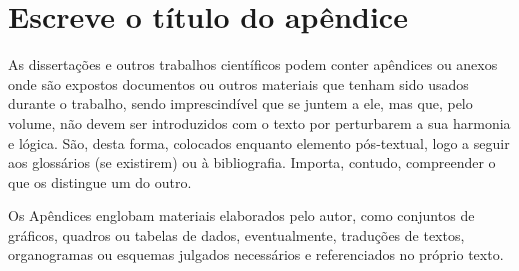 
\chapter{Escreve o título do apêndice} %

\label{AppendixA} %

As dissertações e outros trabalhos científicos podem conter apêndices ou anexos onde são expostos documentos ou outros materiais que tenham sido usados durante o trabalho, sendo imprescindível que se juntem a ele, mas que, pelo volume, não devem ser introduzidos com o texto por perturbarem a sua harmonia e lógica. São, desta forma, colocados enquanto elemento pós-textual, logo a seguir aos glossários (se existirem) ou à bibliografia. Importa, contudo, compreender o que os distingue um do outro.

Os Apêndices englobam materiais elaborados pelo autor, como conjuntos de gráficos, quadros ou tabelas de dados, eventualmente, traduções de textos, organogramas ou esquemas julgados necessários e referenciados no próprio texto.